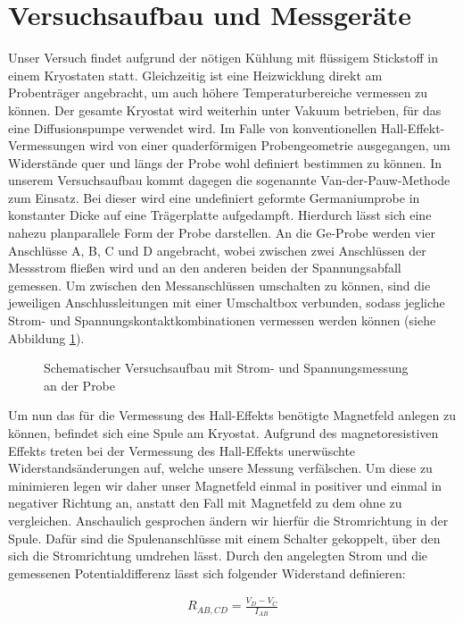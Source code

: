 \section{Versuchsaufbau und Messgeräte}
Unser Versuch findet aufgrund der nötigen Kühlung mit flüssigem Stickstoff in einem Kryostaten statt. Gleichzeitig ist eine Heizwicklung direkt am Probenträger angebracht, um auch höhere Temperaturbereiche vermessen zu können. Der gesamte Kryostat wird weiterhin unter Vakuum betrieben, für das eine Diffusionspumpe verwendet wird. Im Falle von konventionellen Hall-Effekt-Vermessungen wird von einer quaderförmigen Probengeometrie ausgegangen, um Widerstände quer und längs der Probe wohl definiert bestimmen zu können. In unserem Versuchsaufbau kommt dagegen die sogenannte Van-der-Pauw-Methode zum Einsatz. Bei dieser wird eine undefiniert geformte Germaniumprobe in konstanter Dicke auf eine Trägerplatte aufgedampft. Hierdurch lässt sich eine nahezu planparallele Form der Probe darstellen. An die Ge-Probe werden vier Anschlüsse A, B, C und D angebracht, wobei zwischen zwei Anschlüssen der Messstrom fließen wird und an den anderen beiden der Spannungsabfall gemessen. Um zwischen den Messanschlüssen umschalten zu können, sind die jeweiligen Anschlussleitungen mit einer Umschaltbox verbunden, sodass jegliche Strom- und Spannungskontaktkombinationen vermessen werden können (siehe Abbildung \ref{aufbau}). 

\begin{figure}[htbp]  
     
  \caption{Schematischer Versuchsaufbau mit Strom- und Spannungsmessung an der Probe}
  \label{aufbau}
\end{figure}

Um nun das für die Vermessung des Hall-Effekts benötigte Magnetfeld anlegen zu können, befindet sich eine Spule am Kryostat. Aufgrund des magnetoresistiven Effekts treten bei der Vermessung des Hall-Effekts unerwüschte Widerstandsänderungen auf, welche unsere Messung verfälschen. Um diese zu minimieren legen wir daher unser Magnetfeld einmal in positiver und einmal in negativer Richtung an, anstatt den Fall mit Magnetfeld zu dem ohne zu vergleichen. Anschaulich gesprochen ändern wir hierfür die Stromrichtung in der Spule. Dafür sind die Spulenanschlüsse mit einem Schalter gekoppelt, über den sich die Stromrichtung umdrehen lässt. Durch den angelegten Strom und die gemessenen Potentialdifferenz lässt sich folgender Widerstand definieren:

\begin{align}
R_{AB,CD}= \frac{V_D -V_C}{I_{AB}}
\end{align}

